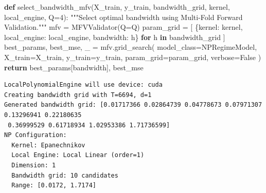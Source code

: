 \documentclass[
  letterpaper,
  DIV=11,
  numbers=noendperiod]{scrartcl}
\newenvironment{Shaded}{\begin{snugshade}}{\end{snugshade}}
\newcommand{\CommentTok}[1]{\textcolor[rgb]{0.37,0.37,0.37}{#1}}
\newcommand{\ControlFlowTok}[1]{\textcolor[rgb]{0.00,0.23,0.31}{\textbf{#1}}}
\newcommand{\DecValTok}[1]{\textcolor[rgb]{0.68,0.00,0.00}{#1}}
\newcommand{\KeywordTok}[1]{\textcolor[rgb]{0.00,0.23,0.31}{\textbf{#1}}}
\newcommand{\NormalTok}[1]{\textcolor[rgb]{0.00,0.23,0.31}{#1}}
\newcommand{\OperatorTok}[1]{\textcolor[rgb]{0.37,0.37,0.37}{#1}}
\newcommand{\StringTok}[1]{\textcolor[rgb]{0.13,0.47,0.30}{#1}}
\newcommand{\VariableTok}[1]{\textcolor[rgb]{0.07,0.07,0.07}{#1}}
\begin{document}
\begin{Shaded}
\begin{Highlighting}[]
\KeywordTok{def}\NormalTok{ select\_bandwidth\_mfv(X\_train, y\_train, bandwidth\_grid, kernel, local\_engine, Q}\OperatorTok{=}\DecValTok{4}\NormalTok{):}
    \CommentTok{"""Select optimal bandwidth using Multi{-}Fold Forward Validation."""}
\NormalTok{    mfv }\OperatorTok{=}\NormalTok{ MFVValidator(Q}\OperatorTok{=}\NormalTok{Q)}
\NormalTok{    param\_grid }\OperatorTok{=}\NormalTok{ [}
\NormalTok{        \{}\StringTok{\textquotesingle{}kernel\textquotesingle{}}\NormalTok{: kernel, }\StringTok{\textquotesingle{}local\_engine\textquotesingle{}}\NormalTok{: local\_engine, }\StringTok{\textquotesingle{}bandwidth\textquotesingle{}}\NormalTok{: h\}}
        \ControlFlowTok{for}\NormalTok{ h }\KeywordTok{in}\NormalTok{ bandwidth\_grid}
\NormalTok{    ]}
\NormalTok{    best\_params, best\_mse, \_ }\OperatorTok{=}\NormalTok{ mfv.grid\_search(}
\NormalTok{        model\_class}\OperatorTok{=}\NormalTok{NPRegimeModel,}
\NormalTok{        X\_train}\OperatorTok{=}\NormalTok{X\_train, y\_train}\OperatorTok{=}\NormalTok{y\_train,}
\NormalTok{        param\_grid}\OperatorTok{=}\NormalTok{param\_grid, verbose}\OperatorTok{=}\VariableTok{False}
\NormalTok{    )}
    \ControlFlowTok{return}\NormalTok{ best\_params[}\StringTok{\textquotesingle{}bandwidth\textquotesingle{}}\NormalTok{], best\_mse}
\end{Highlighting}
\end{Shaded}

\begin{verbatim}
LocalPolynomialEngine will use device: cuda
Creating bandwidth grid with T=6694, d=1
Generated bandwidth grid: [0.01717366 0.02864739 0.04778673 0.07971307 0.13296941 0.22180635
 0.36999529 0.61718934 1.02953386 1.71736599]
NP Configuration:
  Kernel: Epanechnikov
  Local Engine: Local Linear (order=1)
  Dimension: 1
  Bandwidth grid: 10 candidates
  Range: [0.0172, 1.7174]
\end{verbatim}
\end{document}
